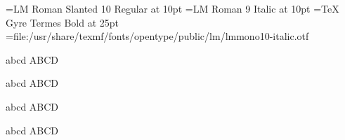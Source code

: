 

\font\testa={LM Roman Slanted 10 Regular} at 10pt
\font\testb={LM Roman 9 Italic}           at 10pt
\font\testc={TeX Gyre Termes Bold}        at 25pt
\font\testd=file:/usr/share/texmf/fonts/opentype/public/lm/lmmono10-italic.otf

\testa abcd ABCD\par
\testb abcd ABCD\par
\testc abcd ABCD\par
\testd abcd ABCD\par

\bye
